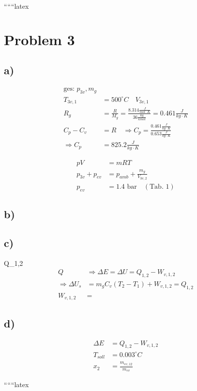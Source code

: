 
``````latex


\section*{Problem 3}

\subsection*{a)}
\begin{align*}
\text{ges: } p_{3v}, m_g \\
T_{3v,1} &= 500^\circ C \quad V_{3v,1} \\
R_g &= \frac{R}{M_g} = \frac{8.314 \frac{J}{mol \cdot K}}{36 \frac{kg}{kmol}} = 0.461 \frac{J}{kg \cdot K} \\
C_p - C_v &= R \quad \Rightarrow C_p = \frac{0.461 \frac{J}{kg \cdot K}}{0.653 \frac{J}{kg \cdot K}} \\
\Rightarrow C_p &= 825.2 \frac{J}{kg \cdot K}
\end{align*}

\begin{align*}
pV &= mRT \\
p_{3v} + p_{ev} &= p_{amb} + \frac{m_g}{V_{3v,2}} \\
p_{ev} &= 1.4 \text{ bar} \quad (\text{Tab. 1})
\end{align*}

\subsection*{b)}
\quad

\subsection*{c)}
 Q_{1,2}
\begin{align*}
Q &\Rightarrow \Delta E = \Delta U = Q_{1,2} - W_{v,1,2} \\
\Rightarrow \Delta U_s &= m_g C_v (T_2 - T_1) + W_{v,1,2} = Q_{1,2} \\
W_{v,1,2} &= 
\end{align*}

\subsection*{d)}
\begin{align*}
\Delta E &= Q_{1,2} - W_{v,1,2} \\
T_{soll} &= 0.003^\circ C \\
x_2 &= \frac{m_{ev,12}}{m_{ev}}
\end{align*}

``````latex


